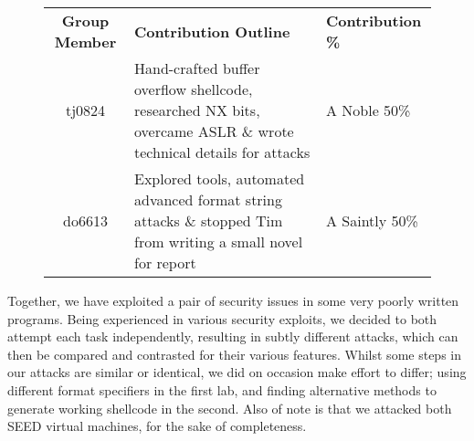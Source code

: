 \begin{figure}[h]
\centering
\begin{tabular}{|c|p{9.5cm}|l|}
\hline
{\bf Group Member} & {\bf Contribution Outline} & {\bf Contribution \%} \\
\hhline{|=|=|=|}
tj0824 & Hand-crafted buffer overflow shellcode, researched NX bits, overcame ASLR \& wrote technical details for attacks & A Noble 50\% \\
\hline
do6613 & Explored tools, automated advanced format string attacks \& stopped Tim from writing a small novel for report & A Saintly 50\% \\
\hline
\end{tabular}
\end{figure}

Together, we have exploited a pair of security issues in some very poorly written programs. Being experienced in various
security exploits, we decided to both attempt each task independently, resulting in subtly different attacks, which can
then be compared and contrasted for their various features. Whilst some steps in our attacks are similar or identical,
we did on occasion make effort to differ; using different format specifiers in the first lab, and finding alternative
methods to generate working shellcode in the second. Also of note is that we attacked both SEED virtual machines, for
the sake of completeness.

